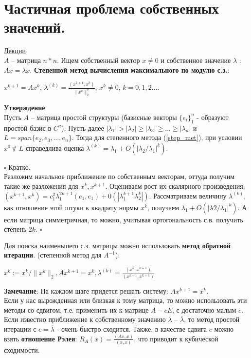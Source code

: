 \documentclass[specialist, subf, href, colorlinks=true, 12pt, times, mtpro, final]{disser}
\theoremstyle{definition}
\begin{document}
{\section {Частичная проблема собственных значений.}
    \hyperlink {lects.78}{Лекции}\\
    $A$ \--- матрица $n*n$. Ищем собственный вектор $x \ne 0$ и собственное значение $\lambda$ : $Ax = \lambda x$.
    \textbf{Степенной метод вычисления максимального по модулю с.з.}:\\
    \begin{center}
    \label{step_met}
    $x^{k+1} = Ax^k$,  $\lambda^{(k)} = \frac{(x^{k+1}, x^k)}{\|x^k\|^2_2}$, $x^k \ne 0$,  $k=0,1,2...$.
    \end{center}
    \textbf{Утверждение}\\
    Пусть $A$ \--- матрица простой структуры (базисные векторы $\{e_i\}^n_1$ - образуют простой базис в $C^n$). Пусть далее $|\lambda_1| > |\lambda_2| \geq |\lambda_3| \geq ... \geq |\lambda_n|$ и $L=span\{e_2,e_3,...,e_n\}$. Тогда для степенного метода (\ref{step_met}), при условии $x^0 \notin L$ справедлива оценка $\lambda^{(k)} = \lambda_1 + O(|\lambda_2/\lambda_1|^k)$.
    
    $\square$ Кратко.\\
    Разложим начальное приближение по собственным векторам, оттуда получим такие же разложения для $x^k, x^{k+1}$. Оцениваем рост их скалярного произведения: $(x^{k+1}, x^k) = c^2_1 \lambda^{2k+1}_1 (e_1, e_1) + 0(|\lambda^{k+1}_1\lambda^k_2|)$.
    Рассматриваем величину $\lambda^{(k)}$, как отношение этой штуки к квадрату нормы $x^k$,  получаем $\lambda_1 + O(|\lambda2/\lambda_1|^k)$. А если матрица симметричная, то можно, учитывая ортогональность с.в. получить степень $2k$. 
    $\square$
    
    
    Для поиска наименьшего с.з. матрицы можно использовать \textbf{метод обратной итерации}. (степенной метод для $A^{-1}$):\\
    \begin{center}
    $x^k := x^k / \|x^k\|_2, Ax^{k+1} = x^k, \lambda^{(k)} = \frac{(x^k, x^{k+1})}{(x^{k+1}, x^{k+1})}$
    \end{center}
    
    \textbf{Замечание}: На каждом шаге придется решать систему: $Ax^{k+1} = x^k$.
\\
Если у нас вырожденная или близкая к тому матрица, то можно использовать эти методы со сдвигом, т.е. применить их к матрице $A-cE$, с достаточно малым $c$.  Если известно приближение к собственному значению $\lambda$ \--- $\overline{\lambda}$, то метод простой итерации с $c = \overline{\lambda}$ - очень быстро сходится. Также, в качестве сдвига $c$ можно взять \textbf{отношение Рэлея}: $R_A(x) = \frac{(Ax, x)}{(x, x)}$, что приводит к кубической сходимости.
    
}
\end{document}
